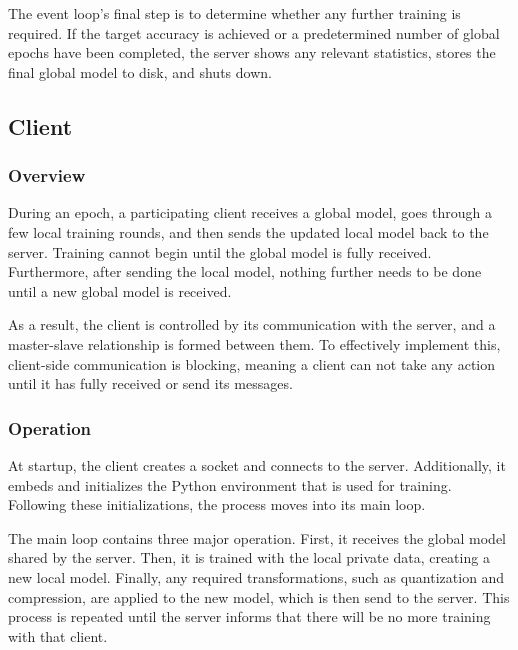 The event loop's final step is to determine whether any further training is required. If the target accuracy is achieved or a predetermined number of global epochs have been completed, the server shows any relevant statistics, stores the final global model to disk, and shuts down.


\subsection{Client}
\subsubsection{Overview}
During an epoch, a participating client receives a global model, goes through a few local training rounds, and then sends the updated local model back to the server. Training cannot begin until the global model is fully received. Furthermore, after sending the local model, nothing further needs to be done until a new global model is received.

As a result, the client is controlled by its communication with the server, and a master-slave relationship is formed between them. To effectively implement this, client-side communication is blocking, meaning a client can not take any action until it has fully received or send its messages.

\subsubsection{Operation}
At startup, the client creates a socket and connects to the server. Additionally, it embeds and initializes the Python environment that is used for training.  Following these initializations, the process moves into its main loop.

The main loop contains three major operation. First, it receives the global model shared by the server. Then, it is trained with the local private data, creating a new local model. Finally, any required transformations, such as quantization and compression, are applied to the new model, which is then send to the server. This process is repeated until the server informs that there will be no more training with that client.

